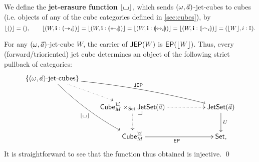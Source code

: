 \documentclass[a4paper]{memoir}
\begin{document}
\begin{definition} \label{def:jet-cube-erasure}
	We define the \textbf{jet-erasure function} $\mathopen{}\left\lfloor {\llcorner\hspace{-.4ex}\lrcorner} \right\rfloor\mathclose{}$, which sends $(\omega, \vec a)$-jet-cubes to cubes (i.e. objects of any of the cube categories defined in \cref{sec:cubes}), by
	\[
		\mathopen{}\left\lfloor () \right\rfloor\mathclose{} = (),
		\qquad
		\mathopen{}\left\lfloor (W, \mathbf{i} : {\llparenthesis \rightarrowtriangle_i \rrparenthesis}) \right\rfloor\mathclose{} =
		\mathopen{}\left\lfloor (W, \mathbf{i} : {\llparenthesis \leftarrowtriangle_i \rrparenthesis}) \right\rfloor\mathclose{} =
		\mathopen{}\left\lfloor (W, \mathbf{i} : {\llparenthesis \leftrightarrowtriangle_i \rrparenthesis}) \right\rfloor\mathclose{} =
		\mathopen{}\left\lfloor (W, \mathbf{i} : {\llparenthesis \frown_i \rrparenthesis}) \right\rfloor\mathclose{} =
		(\mathopen{}\left\lfloor W \right\rfloor\mathclose{}, i : {\mathbb I}).
	\]
\end{definition}
\begin{corollary} \label{thm:jet-cube-pullback}
	For any $(\omega, \vec a)$-jet-cube $W$, the carrier of $\mathsf{JEP}(W)$ is $\mathsf{EP}(\mathopen{}\left\lfloor W \right\rfloor\mathclose{})$.
	Thus, every (forward/trioriented) jet cube determines an object of the following strict pullback of categories:
	\[
			\xymatrix{
				\accol{\text{$(\myorix, \vec a)$-jet-cubes}}
					\ar@/^/[rrrd]^{\JEP}
					\ar@/_/[rdd]_{\erasejc{\loch}}
					\ar@{.>}[rd]
				\\
				&
				\cubecat^\mycubex_M \times_\Set \jetset{\vec a}
					\ar@{.>}[rr]
					\ar@{.>}[d]
					\xydrcorner
				&&
				\jetset{\vec a}
					\ar[d]^U
				\\
				&
				\cubecat^\mycubex_M
					\ar[rr]_{\EP}
				&&
				\Set,
			}
	\]
	It is straightforward to see that the function thus obtained is injective. \qed
\end{corollary}
\end{document}
